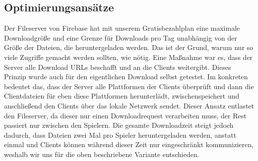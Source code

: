 \subsection{Optimierungsansätze}
Der Fileserver von Firebase hat mit unserem Gratisbezahlplan eine maximale Downloadgröße und eine Grenze für Downloads pro Tag unabhängig von der Größe der Dateien, die heruntergeladen werden. Das ist der Grund, warum nur so viele Zugriffe gemacht werden sollten, wie nötig. Eine Maßnahme war es, dass der Server alle Download URLs beschafft und an die Clients weitergibt. Dieses Prinzip wurde auch für den eigentlichen Download selbst getestet. Im konkreten bedeutet das, dass der Server alle Plattformen der Clients überprüft und dann die Clientdateien für eben diese Plattformen herunterlädt, zwischenspeichert und anschließend den Clients über das lokale Netzwerk sendet. Dieser Ansatz entlastet den Fileserver, da dieser nur einen Downloadrequest verarbeiten muss, der Rest passiert nur zwischen den Spielern. Die gesamte Downloadzeit steigt jedoch dadurch, dass Dateien zwei Mal pro Spieler heruntergeladen werden, anstatt einmal und Clients können während dieser Zeit nur eingeschränkt kommunizieren, weshalb wir uns für die oben beschriebene Variante entschieden.